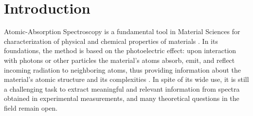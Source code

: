 \documentclass[%
 reprint,
 amsmath,amssymb,
 aps,
]{revtex4-1}
\begin{document}
\maketitle

\section*{Introduction}
%
Atomic-Absorption Spectroscopy is a fundamental tool in Material Sciences for characterization of physical and chemical properties of materials \cite{koningsberger1988x}. 
In its foundations, the method is based on the photoelectric effect: upon interaction with  photons or other particles the material's atoms  absorb, emit, and reflect  incoming radiation to neighboring atoms, thus providing information about the material's atomic structure and its complexities \cite[\S 1-2]{bunkeR1010introduction}. 
In spite of its wide use, it is still a challenging task to extract meaningful and relevant information from spectra obtained in experimental measurements, and many theoretical questions in the field remain open.
\end{document}
